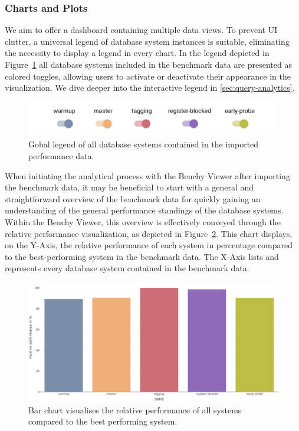 \subsubsection{Charts and Plots}

We aim to offer a dashboard containing multiple data views. To prevent UI clutter, a universal legend of database system instances is suitable, eliminating the necessity to display a legend in every chart. In the legend depicted in Figure~\ref{fig:legend} all database systems included in the benchmark data are presented as colored toggles, allowing users to activate or deactivate their appearance in the visualization. We dive deeper into the interactive legend in \ref{sec:query-analytics}.

\begin{figure}[h]
    \centering
    \includegraphics[width=1\linewidth]{figures/legend.png}
    \caption{Gobal legend of all database systems contained in the imported performance data.}
    \label{fig:legend}
  \end{figure}



When initiating the analytical process with the Benchy Viewer after importing the benchmark data, it may be beneficial to start with a general and straightforward overview of the benchmark data for quickly gaining an understanding of the general performance standings of the database systems.\\
Within the Benchy Viewer, this overview is effectively conveyed through the relative performance visualization, as depicted in Figure~\ref{fig:relative-performance}. This chart displays, on the Y-Axis, the relative performance of each system in percentage compared to the best-performing system in the benchmark data. The X-Axis lists and represents every database system contained in the benchmark data.

\begin{figure}[h]
  \centering
  \includegraphics[width=1\linewidth]{figures/bsp-relative-performance.png}
  \caption{Bar chart visualises the relative performance of all systems compared to the best performing system.}
  \label{fig:relative-performance}
\end{figure}

